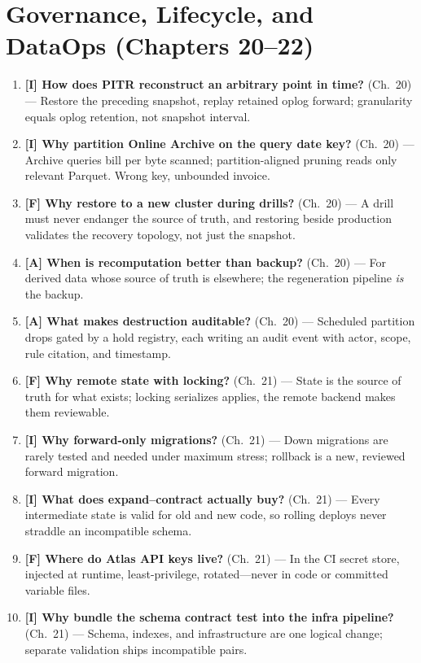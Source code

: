 \section{Governance, Lifecycle, and DataOps (Chapters 20--22)}
\begin{enumerate}
    \item \textbf{[I] How does PITR reconstruct an arbitrary point in time?} (Ch.~20) --- Restore the preceding snapshot, replay retained oplog forward; granularity equals oplog retention, not snapshot interval.
    \item \textbf{[I] Why partition Online Archive on the query date key?} (Ch.~20) --- Archive queries bill per byte scanned; partition-aligned pruning reads only relevant Parquet. Wrong key, unbounded invoice.
    \item \textbf{[F] Why restore to a new cluster during drills?} (Ch.~20) --- A drill must never endanger the source of truth, and restoring beside production validates the recovery topology, not just the snapshot.
    \item \textbf{[A] When is recomputation better than backup?} (Ch.~20) --- For derived data whose source of truth is elsewhere; the regeneration pipeline \emph{is} the backup.
    \item \textbf{[A] What makes destruction auditable?} (Ch.~20) --- Scheduled partition drops gated by a hold registry, each writing an audit event with actor, scope, rule citation, and timestamp.
    \item \textbf{[F] Why remote state with locking?} (Ch.~21) --- State is the source of truth for what exists; locking serializes applies, the remote backend makes them reviewable.
    \item \textbf{[I] Why forward-only migrations?} (Ch.~21) --- Down migrations are rarely tested and needed under maximum stress; rollback is a new, reviewed forward migration.
    \item \textbf{[I] What does expand--contract actually buy?} (Ch.~21) --- Every intermediate state is valid for old and new code, so rolling deploys never straddle an incompatible schema.
    \item \textbf{[F] Where do Atlas API keys live?} (Ch.~21) --- In the CI secret store, injected at runtime, least-privilege, rotated---never in code or committed variable files.
    \item \textbf{[I] Why bundle the schema contract test into the infra pipeline?} (Ch.~21) --- Schema, indexes, and infrastructure are one logical change; separate validation ships incompatible pairs.

\end{enumerate}
